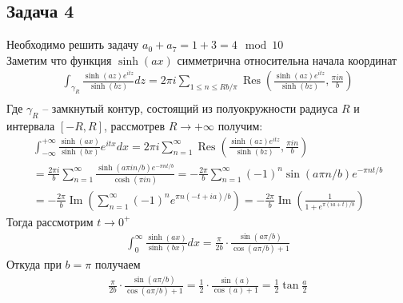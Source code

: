 \subsection*{Задача 4}
	Необходимо решить задачу $a_0 + a_7 = 1 + 3 = 4 \mod 10$\\
	Заметим что функция $\sinh (ax)$ симметрична относительна начала координат
	\begin{gather*}
		\int_{\gamma_{R}} \frac{\sinh (a z) e^{i t z}}{\sinh (b z)} d z=2 \pi i \sum_{1 \leq n \leq R b / \pi} \operatorname{Res}\left(\frac{\sinh (a z) e^{i t z}}{\sinh (b z)}, \frac{\pi i n}{b}\right)\\
	\end{gather*}
	Где $\gamma_{R}$ -- замкнутый контур, состоящий из полуокружности радиуса $R$ и интервала $[-R,R]$, рассмотрев $R \to +\infty$ получим:
	\begin{gather*}
		\int_{-\infty}^{+\infty} \frac{\sinh (a x)}{\sinh (b x)} e^{i t x} d x
		= 2 \pi i \sum_{n=1}^{\infty} \operatorname{Res}\left(\frac{\sinh (a z) e^{i t z}}{\sinh (b z)}, \frac{\pi i n}{b}\right) \\
		= \frac{2 \pi i}{b} \sum_{n=1}^{\infty} \frac{\sinh (a \pi i n / b) e^{-\pi n t / b}}{\cosh (\pi i n)}
		= -\frac{2 \pi}{b} \sum_{n=1}^{\infty}(-1)^{n} \sin (a \pi n / b) e^{-\pi n t / b} \\
		= -\frac{2 \pi}{b} \operatorname{Im}\left(\sum_{n=1}^{\infty}(-1)^{n} e^{\pi n(-t+i a) / b}\right)
		= -\frac{2 \pi}{b} \operatorname{Im}\left(\frac{1}{1+e^{\pi(i a+t) / b}}\right)
	\end{gather*}
	Тогда рассмотрим $t \to 0^{+}$
	\begin{gather*}
		\int_{0}^{\infty} \frac{\sinh(ax)}{\sinh(bx)}dx = \frac{\pi}{2b} \cdot \frac{\sin(a\pi / b)}{\cos(a\pi /b) + 1}
	\end{gather*}
	Откуда при $b = \pi$ получаем
	\begin{gather*}
		\frac{\pi}{2b} \cdot \frac{\sin(a\pi / b)}{\cos(a\pi /b) + 1}
		= \frac{1}{2} \cdot \frac{\sin(a)}{\cos(a) + 1}
		= \frac{1}{2}\tan \frac{a}{2}
	\end{gather*}